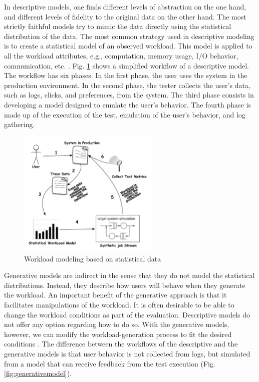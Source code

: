 \documentclass{report}
\begin{document}
In descriptive models, one finds different levels of abstraction on the one hand, and different levels of fidelity to the original data on the other hand. The most strictly faithful models try to mimic the data directly using the statistical distribution of the data. The most common strategy used in descriptive modeling is to create a statistical model of an observed workload. This model is applied to all the workload attributes, e.g., computation, memory usage, I/O behavior, communication, etc. \cite{Feitelson2013}. Fig. \ref{fig:descriptivemodel} shows a simplified workflow of a descriptive model. The workflow has six phases. In the first phase, the user uses the system in the production environment. In the second phase, the tester collects the user's data, such as logs, clicks, and preferences, from the system. The third phase consists in developing a model designed to emulate the user's behavior. The fourth phase is made up of the execution of the test, emulation of the user's behavior, and log gathering.



\begin{figure}[!ht]

\centering
\includegraphics[width=0.6\textwidth]{./images/workloadmodel1300dpi.png}
\caption{Workload modeling based on statistical data \cite{DiLucca2006}}
\label{fig:descriptivemodel}
\end{figure}


Generative models are indirect in the sense that they do not model the statistical distributions. Instead, they describe how users will behave when they generate the workload. An important benefit of the generative approach is that it facilitates manipulations of the workload. It is often desirable to be able to change the workload conditions as part of the evaluation. Descriptive models do not offer any option regarding how to do so. With the generative models, however, we can modify the workload-generation process to fit the desired conditions \cite{Feitelson2013}. The difference between the workflows of the descriptive and the generative models is that user behavior is not collected from logs, but simulated from a model that can receive feedback from the test execution (Fig. \ref{fig:generativemodel}).
\end{document}
